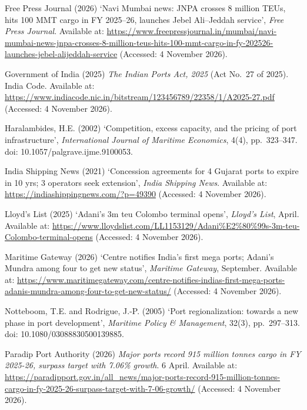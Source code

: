 \documentclass[12pt, a4paper]{article}
\begin{document}
\begin{list}{}{\setlength{\leftmargin}{8mm}\setlength{\itemindent}{-8mm}
               \setlength{\itemsep}{1.1ex}\setlength{\parsep}{0pt}
               \setlength{\topsep}{0pt}}
\item Free Press Journal (2026) `Navi Mumbai news: JNPA crosses 8 million TEUs, hits 100 MMT cargo in FY 2025--26, launches Jebel Ali--Jeddah service', \textit{Free Press Journal}. Available at: \url{https://www.freepressjournal.in/mumbai/navi-mumbai-news-jnpa-crosses-8-million-teus-hits-100-mmt-cargo-in-fy-202526-launches-jebel-alijeddah-service} (Accessed: 4 November 2026).

\item Government of India (2025) \textit{The Indian Ports Act, 2025} (Act No.~27 of 2025). India Code. Available at: \url{https://www.indiacode.nic.in/bitstream/123456789/22358/1/A2025-27.pdf} (Accessed: 4 November 2026).

\item Haralambides, H.E. (2002) `Competition, excess capacity, and the pricing of port infrastructure', \textit{International Journal of Maritime Economics}, 4(4), pp.~323--347. doi: 10.1057/palgrave.ijme.9100053.

\item India Shipping News (2021) `Concession agreements for 4 Gujarat ports to expire in 10 yrs; 3 operators seek extension', \textit{India Shipping News}. Available at: \url{https://indiashippingnews.com/?p=49390} (Accessed: 4 November 2026).

\item Lloyd's List (2025) `Adani's 3m teu Colombo terminal opens', \textit{Lloyd's List}, April. Available at: \url{https://www.lloydslist.com/LL1153129/Adani%E2%80%99s-3m-teu-Colombo-terminal-opens} (Accessed: 4 November 2026).

\item Maritime Gateway (2026) `Centre notifies India's first mega ports; Adani's Mundra among four to get new status', \textit{Maritime Gateway}, September. Available at: \url{https://www.maritimegateway.com/centre-notifies-indias-first-mega-ports-adanis-mundra-among-four-to-get-new-status/} (Accessed: 4 November 2026).

\item Notteboom, T.E. and Rodrigue, J.-P. (2005) `Port regionalization: towards a new phase in port development', \textit{Maritime Policy \& Management}, 32(3), pp.~297--313. doi: 10.1080/03088830500139885.

\item Paradip Port Authority (2026) \textit{Major ports record 915 million tonnes cargo in FY 2025-26, surpass target with 7.06\% growth}. 6 April. Available at: \url{https://paradipport.gov.in/all_news/major-ports-record-915-million-tonnes-cargo-in-fy-2025-26-surpass-target-with-7-06-growth/} (Accessed: 4 November 2026).


\end{list}
\end{document}
